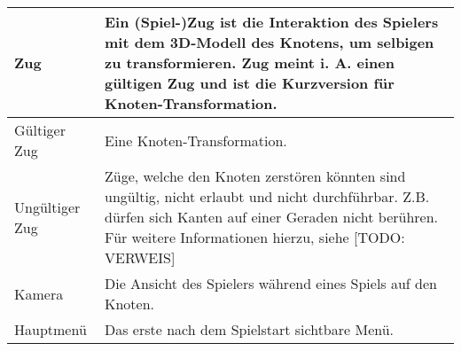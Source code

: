 \begin{longtable}{|p{}|p{}|}
\hline
Zug & Ein (Spiel-)Zug ist die Interaktion des Spielers mit dem 3D-Modell des Knotens, um selbigen zu transformieren. Zug meint i. A. einen gültigen Zug und ist die Kurzversion für Knoten-Transformation.\\
\hline
Gültiger Zug & Eine Knoten-Transformation.\\
\hline
Ungültiger Zug & Züge, welche den Knoten zerstören könnten sind ungültig, nicht erlaubt und nicht durchführbar. Z.B. dürfen sich Kanten auf einer Geraden nicht berühren. Für weitere Informationen hierzu, siehe {\color{red}[TODO: VERWEIS]}\\
\hline
Kamera & Die Ansicht des Spielers während eines Spiels auf den Knoten.\\
\hline
Hauptmenü & Das erste nach dem Spielstart sichtbare Menü.\\
\hline
\end{longtable}

